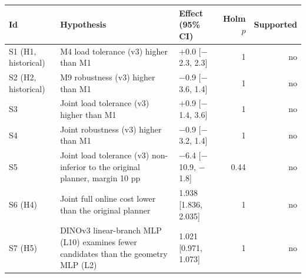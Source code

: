 \begin{tabular}{p{}p{}lrr}
\toprule
Id & Hypothesis & Effect (95\% CI) & Holm $p$ & Supported \\
\midrule
S1 (H1, historical) & M4 load tolerance (v3) higher than M1 & +0.0 [$-$2.3, 2.3] & 1 & no \\
S2 (H2, historical) & M9 robustness (v3) higher than M1 & $-$0.9 [$-$3.6, 1.4] & 1 & no \\
S3 & Joint load tolerance (v3) higher than M1 & +0.9 [$-$1.4, 3.6] & 1 & no \\
S4 & Joint robustness (v3) higher than M1 & $-$0.9 [$-$3.2, 1.4] & 1 & no \\
S5 & Joint load tolerance (v3) non-inferior to the original planner, margin 10 pp & $-$6.4 [$-$10.9, $-$1.8] & 0.44 & no \\
S6 (H4) & Joint full online cost lower than the original planner & 1.938 [1.836, 2.035] & 1 & no \\
S7 (H5) & DINOv3 linear-branch MLP (L10) examines fewer candidates than the geometry MLP (L2) & 1.021 [0.971, 1.073] & 1 & no \\
\bottomrule
\end{tabular}
